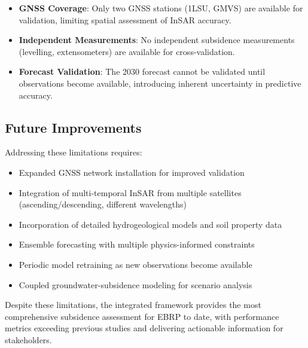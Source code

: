 \begin{itemize}
\item \textbf{GNSS Coverage}: Only two GNSS stations (1LSU, GMVS) are available for validation, limiting spatial assessment of InSAR accuracy.
\item \textbf{Independent Measurements}: No independent subsidence measurements (levelling, extensometers) are available for cross-validation.
\item \textbf{Forecast Validation}: The 2030 forecast cannot be validated until observations become available, introducing inherent uncertainty in predictive accuracy.
\end{itemize}

\subsection{Future Improvements}

Addressing these limitations requires:
\begin{itemize}
\item Expanded GNSS network installation for improved validation
\item Integration of multi-temporal InSAR from multiple satellites (ascending/descending, different wavelengths)
\item Incorporation of detailed hydrogeological models and soil property data
\item Ensemble forecasting with multiple physics-informed constraints
\item Periodic model retraining as new observations become available
\item Coupled groundwater-subsidence modeling for scenario analysis
\end{itemize}

Despite these limitations, the integrated framework provides the most comprehensive subsidence assessment for EBRP to date, with performance metrics exceeding previous studies and delivering actionable information for stakeholders.


